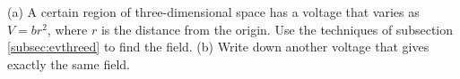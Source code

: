         (a) A certain region of three-dimensional space has a voltage that varies as
        $V=br^2$, where $r$ is the distance from the origin.
        Use the techniques of subsection \ref{subsec:evthreed}
        to find the field.\answercheck\hwendpart
        (b) Write down another voltage that gives exactly the same field.

